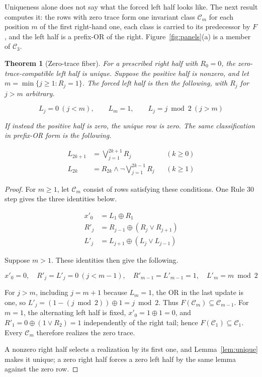 \documentclass[11pt]{article}
\newtheorem{theorem}{Theorem}
\begin{document}
Uniqueness alone does not say what the forced left half looks like.  The next
result computes it: the rows with zero trace form one invariant class
$\mathcal C_m$ for each position $m$ of the first right-hand one, each class is
carried to its predecessor by $F$, and the left half is a prefix-OR of the
right.  Figure~\ref{fig:panels}(a) is a member of $\mathcal C_3$.

\begin{theorem}[Zero-trace fiber]\label{thm:fiber}
For a prescribed right half with $R_0=0$, the zero-trace-compatible left half
is unique.  Suppose the positive half is nonzero, and let
$m=\min\{j\geq1:R_j=1\}$.  The forced left half is then the following, with
$R_j$ for $j>m$ arbitrary.

\begin{equation}\label{eq:pattern}
 L_j=0\ (j<m),\qquad L_m=1,\qquad L_j=j\bmod2\ (j>m)
\end{equation}

If instead the positive half is zero, the unique row is zero.  The same
classification in prefix-OR form is the following.

\begin{align}
 L_{2k+1}&=\bigvee_{j=1}^{2k+1}R_j &&(k\geq0) \label{eq:odd}\\[-2pt]
 L_{2k}&=R_{2k}\land\neg\!\bigvee_{j=1}^{2k-1}R_j &&(k\geq1) \label{eq:even}
\end{align}
\end{theorem}
\begin{proof}
For $m\geq1$, let $\mathcal C_m$ consist of rows satisfying these conditions.
One Rule 30 step gives the three identities below.

\begin{equation}\label{eq:updates}
\begin{aligned}
 x'_0&=L_1\oplus R_1\\
 R'_j&=R_{j-1}\oplus(R_j\lor R_{j+1})\\
 L'_j&=L_{j+1}\oplus(L_j\lor L_{j-1})
\end{aligned}
\end{equation}

Suppose $m>1$.  These identities then give the following.

\begin{equation}\label{eq:step}
 x'_0=0,\quad R'_j=L'_j=0\ (j<m-1),\quad R'_{m-1}=L'_{m-1}=1,
 \quad L'_m=m\bmod2
\end{equation}

For $j>m$, including $j=m+1$ because $L_m=1$, the OR in the last update is
one, so $L'_j=(1-(j\bmod2))\oplus1=j\bmod2$.  Thus
$F(\mathcal C_m)\subseteq\mathcal C_{m-1}$.  For $m=1$, the alternating left
half is fixed, $x'_0=1\oplus1=0$, and
$R'_1=0\oplus(1\lor R_2)=1$ independently of the right tail; hence
$F(\mathcal C_1)\subseteq\mathcal C_1$.  Every $\mathcal C_m$ therefore
realizes the zero trace.

A nonzero right half selects a realization by its first one, and
Lemma~\ref{lem:unique} makes it unique; a zero right half forces a zero left
half by the same lemma against the zero row.
\end{proof}
\end{document}
